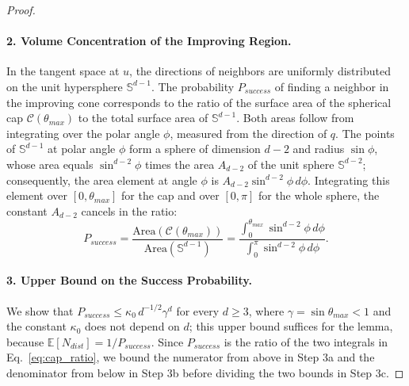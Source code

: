 \documentclass{article}
\theoremstyle{plain}
\theoremstyle{definition}
\theoremstyle{remark}
\begin{document}
\begin{proof}
\paragraph{2. Volume Concentration of the Improving Region.}
In the tangent space at $u$, the directions of neighbors are uniformly distributed on the unit hypersphere $\mathbb{S}^{d-1}$. The probability $P_{success}$ of finding a neighbor in the improving cone corresponds to the ratio of the surface area of the spherical cap $\mathcal{C}(\theta_{max})$ to the total surface area of $\mathbb{S}^{d-1}$.
Both areas follow from integrating over the polar angle $\phi$, measured from the direction of $q$. The points of $\mathbb{S}^{d-1}$ at polar angle $\phi$ form a sphere of dimension $d-2$ and radius $\sin \phi$, whose area equals $\sin^{d-2}\phi$ times the area $A_{d-2}$ of the unit sphere $\mathbb{S}^{d-2}$; consequently, the area element at angle $\phi$ is $A_{d-2} \sin^{d-2}\phi \, d\phi$. Integrating this element over $[0, \theta_{max}]$ for the cap and over $[0, \pi]$ for the whole sphere, the constant $A_{d-2}$ cancels in the ratio:
\begin{equation}
    P_{success} = \frac{\text{Area}(\mathcal{C}(\theta_{max}))}{\text{Area}(\mathbb{S}^{d-1})} = \frac{\int_0^{\theta_{max}} \sin^{d-2} \phi \, d\phi}{\int_0^{\pi} \sin^{d-2} \phi \, d\phi}.
    \label{eq:cap_ratio}
\end{equation}
\paragraph{3. Upper Bound on the Success Probability.}
We show that $P_{success} \le \kappa_0\, d^{-1/2} \gamma^{d}$ for every $d \ge 3$, where $\gamma = \sin\theta_{max} < 1$ and the constant $\kappa_0$ does not depend on $d$; this upper bound suffices for the lemma, because $\mathbb{E}[N_{dist}] = 1/P_{success}$. Since $P_{success}$ is the ratio of the two integrals in Eq.~\eqref{eq:cap_ratio}, we bound the numerator from above in Step 3a and the denominator from below in Step 3b before dividing the two bounds in Step 3c.


\end{proof}
\end{document}
